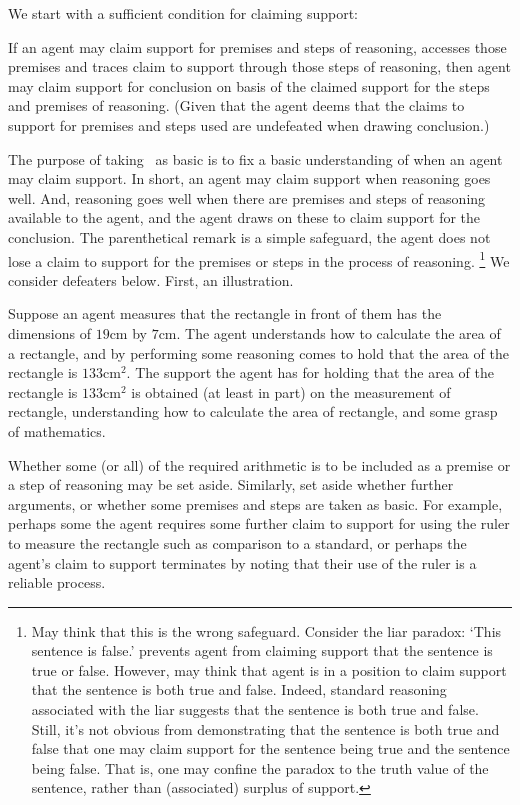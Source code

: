 \begin{note}
  We start with a sufficient condition for claiming support:
  \begin{proposition}[\USE{-} --- \USE{}]\label{prem:bP}\label{prop:USE}
    If an agent may claim support for premises and steps of reasoning, accesses those premises and traces claim to support through those steps of reasoning, then agent may claim support for conclusion on basis of the claimed support for the steps and premises of reasoning.
    (Given that the agent deems that the claims to support for premises and steps used are undefeated when drawing conclusion.)
  \end{proposition}

  The purpose of taking~\USE{} as basic is to fix a basic understanding of when an agent may claim support.
  In short, an agent may claim support when reasoning goes well.
  And, reasoning goes well when there are premises and steps of reasoning available to the agent, and the agent draws on these to claim support for the conclusion.
  The parenthetical remark is a simple safeguard, the agent does not lose a claim to support for the premises or steps in the process of reasoning.\nolinebreak
  \footnote{
    May think that this is the wrong safeguard.
    Consider the liar paradox:
    `This sentence is false.'
    \USE{} prevents agent from claiming support that the sentence is true or false.
    However, may think that agent is in a position to claim support that the sentence is both true and false.
    Indeed, standard reasoning associated with the liar suggests that the sentence is both true and false.
    Still, it's not obvious from demonstrating that the sentence is both true and false that one may claim support for the sentence being true and the sentence being false.
    That is, one may confine the paradox to the truth value of the sentence, rather than (associated) surplus of support.
  }
  We consider defeaters below.
  First, an illustration.

  \begin{illustration}\label{ill:rectangle:basic}
    Suppose an agent measures that the rectangle in front of them has the dimensions of \(19\text{cm}\) by \(7\text{cm}\).
    The agent understands how to calculate the area of a rectangle, and by performing some reasoning comes to hold that the area of the rectangle is \(133\text{cm}^{2}\).
    The support the agent has for holding that the area of the rectangle is \(133\text{cm}^{2}\) is obtained (at least in part) on the measurement of rectangle, understanding how to calculate the area of rectangle, and some grasp of mathematics.
  \end{illustration}

  Whether some (or all) of the required arithmetic is to be included as a premise or a step of reasoning may be set aside.
  Similarly, set aside whether further arguments, or whether some premises and steps are taken as basic.
  For example, perhaps some the agent requires some further claim to support for using the ruler to measure the rectangle such as comparison to a standard, or perhaps the agent's claim to support terminates by noting that their use of the ruler is a reliable process.
\end{note}

